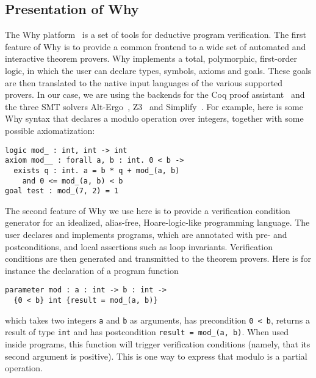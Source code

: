 \documentclass[runningheads,a4paper]{llncs}
\newcommand{\beforesub}{\vspace{-0.2cm}}
\newcommand{\aftersub}{\vspace{-0.1cm}}
\begin{document}
\beforesub
\subsection{Presentation of Why}
\label{subsec:why}
\aftersub

The Why platform~\cite{why} is a set of tools for deductive program
verification. The first feature of Why is to provide a common
frontend to a wide set of automated and interactive theorem provers. 
Why implements a total, polymorphic, first-order logic, in which the user can
declare types, symbols, axioms and goals. These goals are then
translated to the native input languages of the various supported
provers. In our case, we are using the backends for the Coq proof
assistant~\cite{coq} and the three SMT solvers Alt-Ergo~\cite{alt-ergo},
Z3~\cite{Z3} and Simplify~\cite{Simplify}.
%
For example, here is some Why syntax that declares a
modulo operation over integers, together with some possible axiomatization:
\begin{lstlisting}
logic mod_ : int, int -> int
axiom mod__ : forall a, b : int. 0 < b -> 
  exists q : int. a = b * q + mod_(a, b)
    and 0 <= mod_(a, b) < b 
goal test : mod_(7, 2) = 1
\end{lstlisting}
The second feature of Why we use here is to provide a
verification condition generator for an idealized, alias-free,
Hoare-logic-like programming language. The user declares and
implements programs, which are annotated with pre- and postconditions,
and local assertions such as loop invariants. Verification conditions
are then generated and transmitted to the theorem provers.
Here is for instance the declaration of a program function
\begin{lstlisting}
parameter mod : a : int -> b : int ->
  {0 < b} int {result = mod_(a, b)}
\end{lstlisting}
which takes two integers \texttt{a} and \texttt{b} as arguments, has
precondition \texttt{0 < b}, returns a result of type \texttt{int} and
has postcondition \verb|result = mod_(a, b)|. When used inside programs,
this function will trigger verification conditions (namely, that
its second argument is positive). This is one way to express that
modulo is a partial operation.

\end{document}
